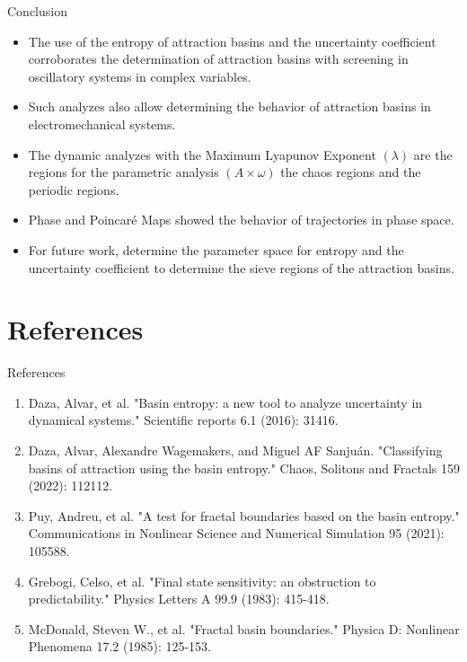 \documentclass[
	10pt,aspectratio=169 %
]{beamer}
\begin{document}
\begin{frame}{Conclusion}
     \transwipe
   \begin{itemize}
\item The use of the entropy of attraction basins and the uncertainty coefficient corroborates the determination of attraction basins with screening in oscillatory systems in complex variables.
        \item Such analyzes also allow determining the behavior of attraction basins in electromechanical systems.
        \item The dynamic analyzes with the Maximum Lyapunov Exponent $(\lambda)$ are the regions for the parametric analysis $(A \times \omega)$ the chaos regions and the periodic regions.
        \item Phase and Poincaré Maps showed the behavior of trajectories in phase space.
        \item For future work, determine the parameter space for entropy and the uncertainty coefficient to determine the sieve regions of the attraction basins.
   \end{itemize}  
\end{frame}

   
\section{References}
   \transwipe
\begin{frame}{References}
    \begin{enumerate}
        \item Daza, Alvar, et al. "Basin entropy: a new tool to analyze uncertainty in dynamical systems." Scientific reports 6.1 (2016): 31416.
        \item Daza, Alvar, Alexandre Wagemakers, and Miguel AF Sanjuán. "Classifying basins of attraction using the basin entropy." Chaos, Solitons and Fractals 159 (2022): 112112.
        \item Puy, Andreu, et al. "A test for fractal boundaries based on the basin entropy." Communications in Nonlinear Science and Numerical Simulation 95 (2021): 105588. 
        \item Grebogi, Celso, et al. "Final state sensitivity: an obstruction to predictability." Physics Letters A 99.9 (1983): 415-418.
        \item McDonald, Steven W., et al. "Fractal basin boundaries." Physica D: Nonlinear Phenomena 17.2 (1985): 125-153.
    \end{enumerate}
\end{frame}
\end{document}
